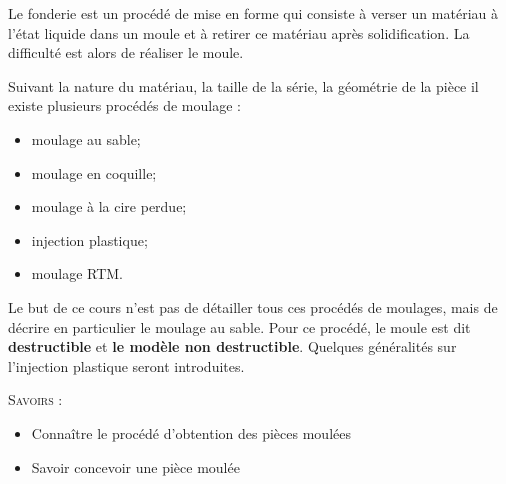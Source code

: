 \documentclass[11pt,oneside]{article}
\begin{document}
\vspace{.5cm}










Le fonderie est un procédé de mise en forme qui consiste à verser un matériau à l'état liquide dans un moule et à retirer ce matériau après solidification. La difficulté est alors de réaliser le moule.

Suivant la nature du matériau, la taille de la série, la géométrie de la pièce il existe plusieurs procédés de moulage :
\begin{itemize}
\item moulage au sable;
\item moulage en coquille;
\item moulage à la cire perdue;
\item injection plastique;
\item moulage RTM.
\end{itemize}

Le but de ce cours n'est pas de détailler tous ces procédés de moulages, mais de décrire en particulier le moulage au sable. Pour ce procédé, le moule est dit \textbf{destructible} et \textbf{le modèle non destructible}. Quelques généralités sur l'injection plastique seront introduites. 

\begin{savoir}
\textsc{Savoirs :}
\begin{itemize}
\item Connaître le procédé d'obtention des pièces moulées
\item Savoir concevoir une pièce moulée
\end{itemize}
\end{savoir}


\setlength{\parskip}{0ex plus 0.2ex minus 0ex}
 \renewcommand{\contentsname}{}
 \renewcommand{\baselinestretch}{1}
\end{document}
